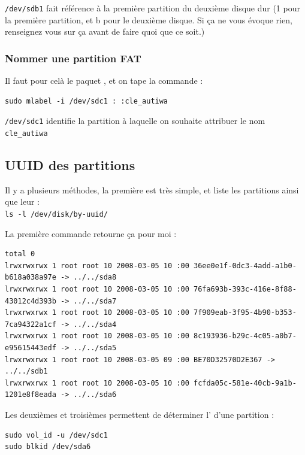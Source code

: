\documentclass[a4paper,twoside]{article}
\begin{document}
\begin{remarque}
\texttt{/dev/sdb1} fait référence à la première partition du deuxième disque dur (1 pour la première partition, et b pour le deuxième disque. Si ça ne vous évoque rien, renseignez vous sur ça avant de faire quoi que ce soit.)
\end{remarque}

\subsubsection{Nommer une partition FAT}
Il faut pour celà le paquet , et on tape la commande :

\begin{verbatim}
sudo mlabel -i /dev/sdc1 : :cle_autiwa
\end{verbatim}

\texttt{/dev/sdc1} identifie la partition à laquelle on souhaite attribuer le nom \texttt{cle\_autiwa}

\subsection{UUID des partitions}
Il y a plusieurs méthodes, la première est très simple, et liste les partitions ainsi que leur  :\\
\verb|ls -l /dev/disk/by-uuid/|

La première commande retourne ça pour moi :

\begin{small}\begin{verbatim}
total 0
lrwxrwxrwx 1 root root 10 2008-03-05 10 :00 36ee0e1f-0dc3-4add-a1b0-b618a038a97e -> ../../sda8
lrwxrwxrwx 1 root root 10 2008-03-05 10 :00 76fa693b-393c-416e-8f88-43012c4d393b -> ../../sda7
lrwxrwxrwx 1 root root 10 2008-03-05 10 :00 7f909eab-3f95-4b90-b353-7ca94322a1cf -> ../../sda4
lrwxrwxrwx 1 root root 10 2008-03-05 10 :00 8c193936-b29c-4c05-a0b7-e95615443edf -> ../../sda5
lrwxrwxrwx 1 root root 10 2008-03-05 09 :00 BE70D32570D2E367 -> ../../sdb1
lrwxrwxrwx 1 root root 10 2008-03-05 10 :00 fcfda05c-581e-40cb-9a1b-1201e8f8eada -> ../../sda6
\end{verbatim}\end{small}

Les deuxièmes et troisièmes permettent de déterminer l' d'une partition :

\begin{verbatim}
sudo vol_id -u /dev/sdc1
sudo blkid /dev/sda6
\end{verbatim}
\end{document}

